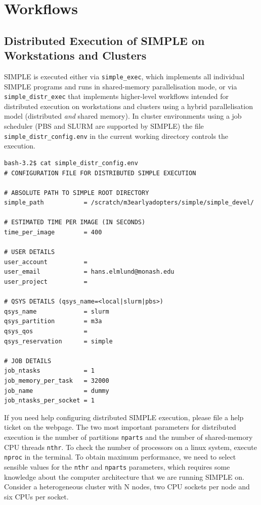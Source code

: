 \documentclass[a4paper,11pt]{article}
\begin{document}
\section{Workflows}

\subsection{Distributed Execution of SIMPLE on Workstations and Clusters}
SIMPLE is executed either via \texttt{simple\_exec}, which implements all individual SIMPLE programs and runs in shared-memory parallelisation mode, or via \texttt{simple\_distr\_exec} that implements higher-level workflows intended for distributed execution on workstations and clusters using a hybrid parallelisation model (distributed \textit{and} shared memory). In cluster environments using a job scheduler (PBS and SLURM are supported by SIMPLE) the file \texttt{simple\_distr\_config.env} in the current working directory controls the execution.
\begin{verbatim}
bash-3.2$ cat simple_distr_config.env 
# CONFIGURATION FILE FOR DISTRIBUTED SIMPLE EXECUTION

# ABSOLUTE PATH TO SIMPLE ROOT DIRECTORY
simple_path           = /scratch/m3earlyadopters/simple/simple_devel/

# ESTIMATED TIME PER IMAGE (IN SECONDS)
time_per_image        = 400

# USER DETAILS
user_account          = 
user_email            = hans.elmlund@monash.edu
user_project          = 

# QSYS DETAILS (qsys_name=<local|slurm|pbs>)
qsys_name             = slurm
qsys_partition        = m3a
qsys_qos              =
qsys_reservation      = simple

# JOB DETAILS
job_ntasks            = 1
job_memory_per_task   = 32000
job_name              = dummy
job_ntasks_per_socket = 1
\end{verbatim}
If you need help configuring distributed SIMPLE execution, please file a help ticket on the webpage. The two most important parameters for distributed execution is the number of partitions \texttt{nparts} and the number of shared-memory CPU threads \texttt{nthr}. To check the number of processors on a linux system, execute \texttt{nproc} in the terminal. To obtain maximum performance, we need to select sensible values for the \texttt{nthr} and \texttt{nparts} parameters, which requires some knowledge about the computer architecture that we are running SIMPLE on.  Consider a heterogeneous cluster with N nodes, two CPU sockets per node and six CPUs per socket.
\end{document}
